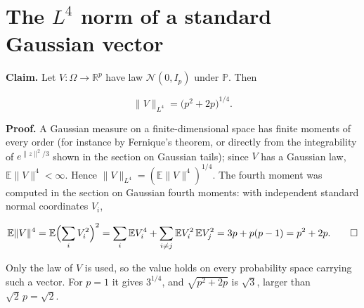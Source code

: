 \documentclass[11pt,a4paper]{article}
\begin{document}
\section{\texorpdfstring{The \(L^4\) norm of a standard Gaussian vector}{The L⁴ norm of a standard Gaussian vector}}


\textbf{Claim.} Let \(V:\Omega\to\mathbb R^p\) have law \(\mathcal N(0,I_p)\) under \(\mathbb P\). Then


\[\|V\|_{L^4}=\bigl(p^2+2p\bigr)^{1/4}.\]


\textbf{Proof.} A Gaussian measure on a finite-dimensional space has finite moments of every order (for instance by Fernique's theorem, or directly from the integrability of \(e^{\|z\|^2/3}\) shown in the section on Gaussian tails); since \(V\) has a Gaussian law, \(\mathbb E\|V\|^4<\infty\). Hence \(\|V\|_{L^4}=(\mathbb E\|V\|^4)^{1/4}\). The fourth moment was computed in the section on Gaussian fourth moments: with independent standard normal coordinates \(V_i\),


\[\mathbb E\|V\|^4=\mathbb E\Bigl(\sum_iV_i^2\Bigr)^2=\sum_i\mathbb EV_i^4+\sum_{i\ne j}\mathbb EV_i^2\,\mathbb EV_j^2=3p+p(p-1)=p^2+2p.\qquad\square\]


Only the law of \(V\) is used, so the value holds on every probability space carrying such a vector. For \(p=1\) it gives \(3^{1/4}\), and \(\sqrt{p^2+2p}\) is \(\sqrt3\), larger than \(\sqrt2\,p=\sqrt2\).
\end{document}
